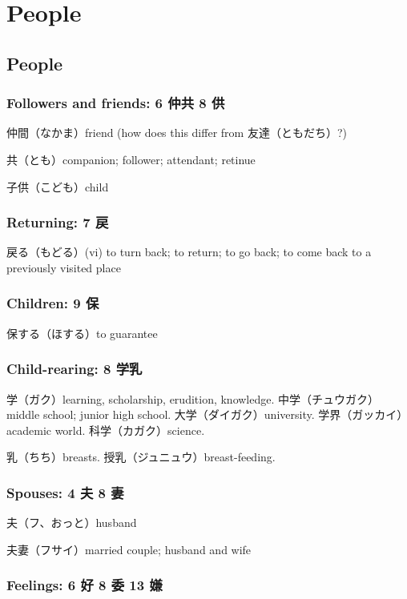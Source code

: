 \chapter{People}

\section{People}

\subsection{Followers and friends: 6 仲共 8 供}

仲間（なかま）friend (how does this differ from 友達（ともだち）?)

共（とも）companion; follower; attendant; retinue

子供（こども）child

\subsection{Returning: 7 戻}

戻る（もどる）(vi) to turn back; to return; to go back;
to come back to a previously visited place

\subsection{Children: 9 保}

保する（ほする）to guarantee

\subsection{Child-rearing: 8 学乳}

学（ガク）learning, scholarship, erudition, knowledge.
中学（チュウガク）middle school; junior high school.
大学（ダイガク）university.
学界（ガッカイ）academic world.
科学（カガク）science.

乳（ちち）breasts.
授乳（ジュニュウ）breast-feeding.

\subsection{Spouses: 4 夫 8 妻}

夫（フ、おっと）husband

夫妻（フサイ）married couple; husband and wife

\subsection{Feelings: 6 好 8 委 13 嫌}

